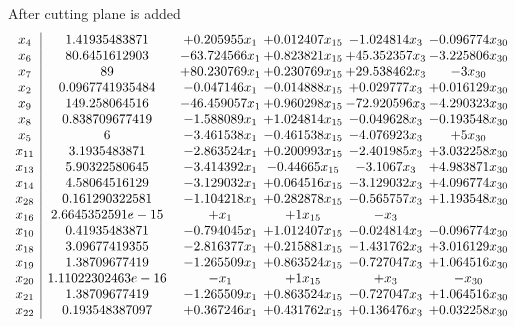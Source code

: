 \documentclass[11pt]{article}
\begin{document}
 After cutting plane is added 
\[\begin{array}{c| c c@{\hskip 2pt} c@{\hskip 2pt} c@{\hskip 2pt} c@{\hskip 2pt} }
 x_{4}   &  1.41935483871 & + 0.205955 x_{1} & + 0.012407 x_{15} & -1.024814 x_{3} & -0.096774 x_{30}\\
 x_{6}   &  80.6451612903 & -63.724566 x_{1} & + 0.823821 x_{15} & + 45.352357 x_{3} & -3.225806 x_{30}\\
 x_{7}   &  89 & + 80.230769 x_{1} & + 0.230769 x_{15} & + 29.538462 x_{3} & -3 x_{30}\\
 x_{2}   &  0.0967741935484 & -0.047146 x_{1} & -0.014888 x_{15} & + 0.029777 x_{3} & + 0.016129 x_{30}\\
 x_{9}   &  149.258064516 & -46.459057 x_{1} & + 0.960298 x_{15} & -72.920596 x_{3} & -4.290323 x_{30}\\
 x_{8}   &  0.838709677419 & -1.588089 x_{1} & + 1.024814 x_{15} & -0.049628 x_{3} & -0.193548 x_{30}\\
 x_{5}   &  6 & -3.461538 x_{1} & -0.461538 x_{15} & -4.076923 x_{3} & + 5 x_{30}\\
 x_{11}   &  3.1935483871 & -2.863524 x_{1} & + 0.200993 x_{15} & -2.401985 x_{3} & + 3.032258 x_{30}\\
 x_{13}   &  5.90322580645 & -3.414392 x_{1} & -0.44665 x_{15} & -3.1067 x_{3} & + 4.983871 x_{30}\\
 x_{14}   &  4.58064516129 & -3.129032 x_{1} & + 0.064516 x_{15} & -3.129032 x_{3} & + 4.096774 x_{30}\\
 x_{28}   &  0.161290322581 & -1.104218 x_{1} & + 0.282878 x_{15} & -0.565757 x_{3} & + 1.193548 x_{30}\\
 x_{16}   &  2.6645352591e-15 & +  x_{1} & + 1 x_{15} & - x_{3} &   \\
 x_{10}   &  0.41935483871 & -0.794045 x_{1} & + 1.012407 x_{15} & -0.024814 x_{3} & -0.096774 x_{30}\\
 x_{18}   &  3.09677419355 & -2.816377 x_{1} & + 0.215881 x_{15} & -1.431762 x_{3} & + 3.016129 x_{30}\\
 x_{19}   &  1.38709677419 & -1.265509 x_{1} & + 0.863524 x_{15} & -0.727047 x_{3} & + 1.064516 x_{30}\\
 x_{20}   &  1.11022302463e-16 & - x_{1} & + 1 x_{15} & +  x_{3} & - x_{30}\\
 x_{21}   &  1.38709677419 & -1.265509 x_{1} & + 0.863524 x_{15} & -0.727047 x_{3} & + 1.064516 x_{30}\\
 x_{22}   &  0.193548387097 & + 0.367246 x_{1} & + 0.431762 x_{15} & + 0.136476 x_{3} & + 0.032258 x_{30}\\

\end{array}\]
\end{document}
